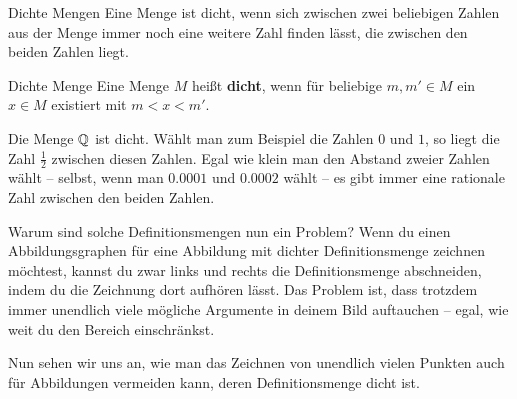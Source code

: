 \documentclass[../../main.tex]{subfiles}
\begin{document}
\begin{advanced}{Dichte Mengen}
    Eine Menge ist dicht, wenn sich zwischen zwei beliebigen Zahlen aus der Menge immer noch eine weitere Zahl finden lässt, die zwischen den beiden Zahlen liegt.
    
    \begin{definition}{Dichte Menge}
        Eine Menge $M$ heißt \textbf{dicht}, wenn für beliebige $m,m'\in M$ ein $x\in M$ existiert mit $m<x<m'$.
    \end{definition}
    
    \begin{advexample}
        Die Menge $\mathbb{Q}$ ist dicht. Wählt man zum Beispiel die Zahlen $0$ und $1$, so liegt die Zahl $\frac{1}{2}$ zwischen diesen Zahlen. Egal wie klein man den Abstand zweier Zahlen wählt -- selbst, wenn man $0.0001$ und $0.0002$ wählt -- es gibt immer eine rationale Zahl zwischen den beiden Zahlen.
    \end{advexample}
\end{advanced}

Warum sind solche Definitionsmengen nun ein Problem? Wenn du einen Abbildungsgraphen für eine Abbildung mit dichter Definitionsmenge zeichnen möchtest, kannst du zwar links und rechts die Definitionsmenge abschneiden, indem du die Zeichnung dort aufhören lässt. Das Problem ist, dass trotzdem immer unendlich viele mögliche Argumente in deinem Bild auftauchen -- egal, wie weit du den Bereich einschränkst.

Nun sehen wir uns an, wie man das Zeichnen von unendlich vielen Punkten auch für Abbildungen vermeiden kann, deren Definitionsmenge dicht ist.
\end{document}
